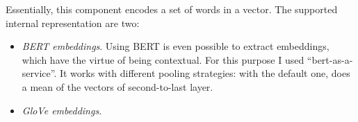 Essentially, this component encodes a set of words in a vector. The supported internal representation are two:
\begin{itemize}
  \item \textit{BERT embeddings}. Using BERT is even possible to extract embeddings, which have the virtue of being contextual. For this purpose I used ``bert-as-a-service''. It works with different pooling strategies: with the default one, does a mean of the vectors of second-to-last layer.
  \item \textit{GloVe embeddings}.
\end{itemize}
